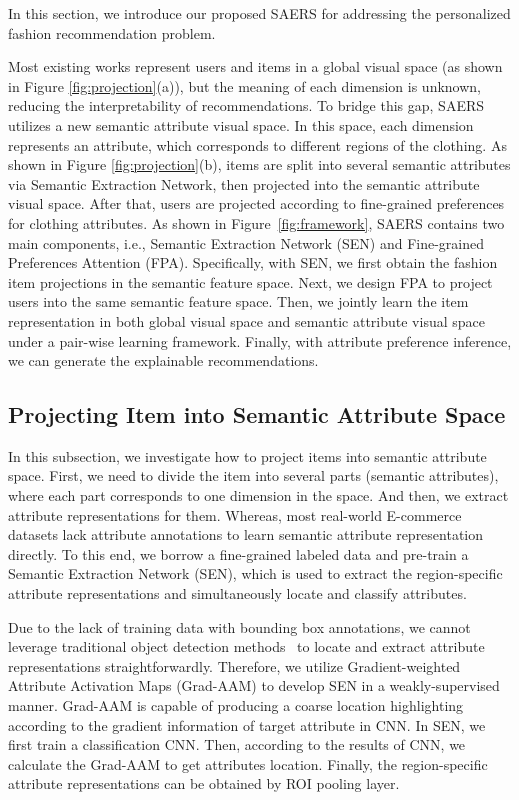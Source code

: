 \documentclass{article}
\begin{document}
In this section, we introduce our proposed SAERS for addressing the personalized fashion recommendation problem. 

Most existing works represent users and items in a global visual space (as shown in Figure \ref{fig:projection}(a)), but the meaning of each dimension is unknown, reducing the interpretability of recommendations.
To bridge this gap, SAERS utilizes a new semantic attribute visual space. In this space, each dimension represents an attribute, which corresponds to different regions of the clothing. As shown in Figure \ref{fig:projection}(b), items are split into several semantic attributes via Semantic Extraction Network, then projected into the semantic attribute visual space. After that, users are projected according to fine-grained preferences for clothing attributes. As shown in Figure~\ref{fig:framework}, SAERS contains two main components, i.e., Semantic Extraction Network (SEN) and Fine-grained Preferences Attention (FPA). Specifically, with SEN, we first obtain the fashion item projections in the semantic feature space. Next, we design FPA to project users into the same semantic feature space. Then, we jointly learn the item representation in both global visual space and semantic attribute visual space under a pair-wise learning framework. Finally, with attribute preference inference, we can generate the explainable recommendations.

\subsection{Projecting Item into Semantic Attribute Space}

In this subsection, we investigate how to project items into semantic attribute space. First, we need to divide the item into several parts (semantic attributes), where each part corresponds to one dimension in the space. And then, we extract attribute representations for them. Whereas, most real-world E-commerce datasets lack attribute annotations to learn semantic attribute representation directly. To this end, we borrow a fine-grained labeled data and pre-train a Semantic Extraction Network (SEN), which is used to extract the region-specific attribute representations and simultaneously locate and classify attributes.

Due to the lack of training data with bounding box annotations, we cannot leverage traditional object detection methods~\cite{girshick2015fast} to locate and extract attribute representations straightforwardly. Therefore, we utilize Gradient-weighted Attribute Activation Maps (Grad-AAM) \cite{selvaraju2017grad} to develop SEN in a weakly-supervised manner. Grad-AAM is capable of producing a coarse location highlighting according to the gradient information of target attribute in CNN. In SEN, we first train a classification CNN. Then, according to the results of CNN, we calculate the Grad-AAM to get attributes location. Finally, the region-specific attribute representations can be obtained by ROI pooling layer. 
\end{document}
